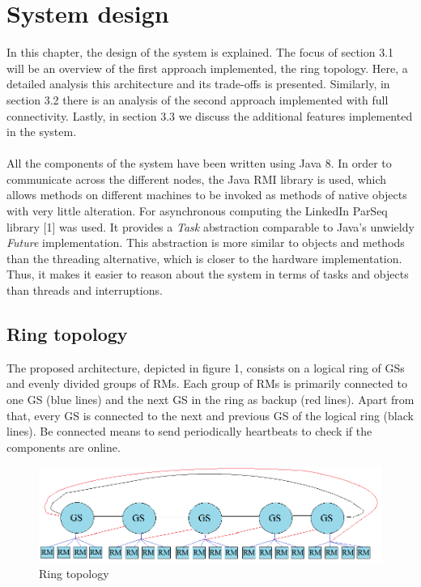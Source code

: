 \section{System design}
In this chapter, the design of the system is explained.
The focus of section 3.1 will be an overview of the first approach implemented, the ring topology. Here, a detailed analysis this architecture and its trade-offs is presented. Similarly, in section 3.2 there is an analysis of the second approach implemented with full connectivity. Lastly, in section 3.3 we discuss the additional features implemented in the system. \\\\
All the components of the system have been written using Java 8. In order to communicate across the different nodes, the Java RMI library is used, which
allows methods on different machines to be invoked as methods
of native objects with very little alteration.
For asynchronous computing the LinkedIn ParSeq library [1] was used.
It provides a \textit{Task} abstraction comparable to Java's
unwieldy \textit{Future} implementation.
This abstraction is more similar to objects and methods than the threading
alternative, which is closer to the hardware implementation.
Thus, it makes it easier to reason about the system in terms of tasks and objects than threads and interruptions.

\subsection{Ring topology}

The proposed architecture, depicted in figure 1, consists on a logical ring of GSs and evenly divided groups of RMs.
Each group of RMs is primarily connected to one GS (blue lines) and the next GS in the ring as backup (red lines). Apart from that, every GS is connected to the next and previous GS of the logical ring (black lines). Be connected means to send periodically heartbeats to check if the components are online. 
\\ 
\begin{figure}[H]
\centering
	\includegraphics[scale=0.61]{ring.png}
	\caption{Ring topology}
\end{figure}

